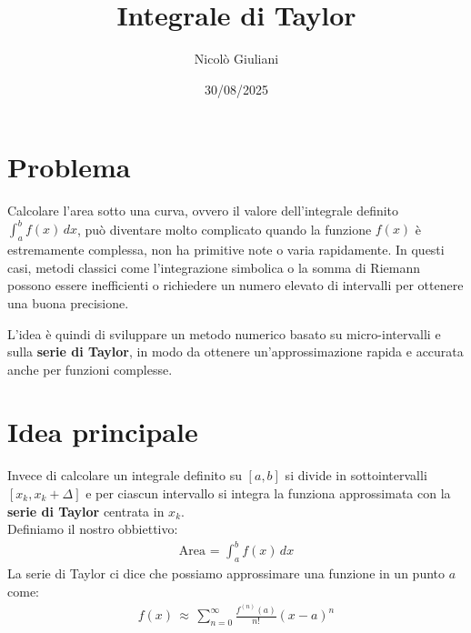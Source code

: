 \documentclass[10pt]{extarticle}
\title{Integrale di Taylor}
\author{Nicolò Giuliani}
\date{30/08/2025}
\begin{document}
\maketitle
\section{Problema}

Calcolare l'area sotto una curva, ovvero il valore dell'integrale definito
\(\int_a^b f(x) \, dx\), può diventare molto complicato quando la funzione \(f(x)\) è estremamente complessa, non ha primitive note o varia rapidamente.  
In questi casi, metodi classici come l'integrazione simbolica o la somma di Riemann possono essere inefficienti o richiedere un numero elevato di intervalli per ottenere una buona precisione.

L'idea è quindi di sviluppare un metodo numerico basato su micro-intervalli e sulla \textbf{serie di Taylor}, in modo da ottenere un'approssimazione rapida e accurata anche per funzioni complesse.
\section{Idea principale}
Invece di calcolare un integrale definito su $[a,b]$ si divide in sottointervalli $[x_k, x_k+\Delta]$ e per ciascun intervallo si integra la funziona approssimata con la \textbf{serie di Taylor} centrata in $x_k$.
\vspace{2em}\\
Definiamo il nostro obbiettivo:
\begin{align*}
    \text{Area = } \int_{a}^{b} f(x) \, dx
\end{align*}
La serie di Taylor ci dice che possiamo approssimare una funzione in un punto $a$ come:
\begin{align*}
    f(x) \, \approx \, \sum_{n=0}^{\infty} \frac{f^{(n)}(a)}{n!} (x-a)^n
\end{align*}
\end{document}
